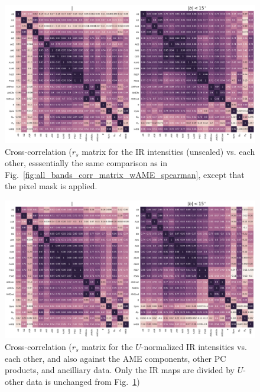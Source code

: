               \begin{figure}
                \includegraphics[width=\textwidth]{../Plots/ch_allsky/all_bands_corr_matrix_wAME_spearmanintensity_maskall.pdf}
                \centering
                \caption{Cross-correlation ($r_{s}$ matrix for the IR intensities (unscaled) vs. each other, esssentially the same comparison as in Fig.~\ref{fig:all_bands_corr_matrix_wAME_spearman}, except that the pixel mask is applied.}
                \label{fig:all_bands_corr_matrix_wAME_spearmanintensity_maskall}
              \end{figure}
              \begin{figure}
                \includegraphics[width=\textwidth]{../Plots/ch_allsky/all_bands_corr_matrix_wAME_spearmanU_norm_masked.pdf}
                \centering
                \caption{Cross-correlation ($r_{s}$ matrix for the $U$-normalized IR intensities vs. each other, and also against the AME components, other PC products, and ancilliary data. Only the IR maps are divided by $U$- other data is unchanged from Fig.~\ref{fig:all_bands_corr_matrix_wAME_spearmanintensity_maskall})}
                \label{fig:all_bands_corr_matrix_wAME_spearmanU_norm_masked}
              \end{figure}

